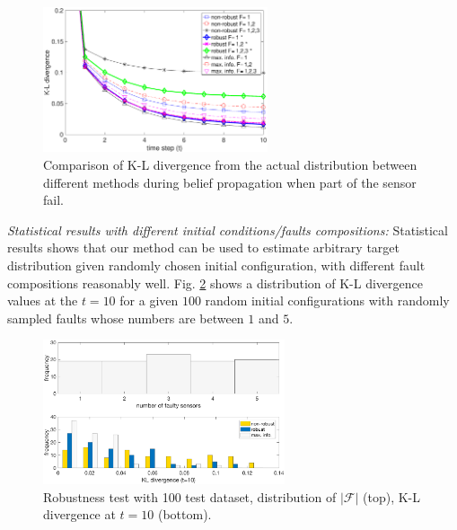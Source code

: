 \documentclass[letterpaper, 10 pt, conference]{ieeeconf}
\begin{document}
\begin{figure}
	\centering
	\includegraphics[width=2.6in]{figure/cost_comp000}
	\caption{Comparison of K-L divergence from the actual distribution between different methods during belief propagation when part of the sensor fail.}
	\label{fig:fig7}
\end{figure}


\textit{Statistical results with different initial conditions/faults compositions:}
Statistical results shows that our method can be used to estimate arbitrary target distribution given randomly chosen initial configuration, with different fault compositions reasonably well. 
Fig. \ref{fig:fig8} shows a distribution of K-L divergence values at the $t=10$ for a given $100$ random initial configurations with randomly sampled faults whose numbers are between $1$ and $5$.
\begin{figure}
	\centering
	\includegraphics[width=2.8in]{figure/stat_result}
	\caption{Robustness test with 100 test dataset, distribution of $\left|\mathcal{F}\right|$ (top), K-L divergence at $t=10$ (bottom).} 
	\label{fig:fig8}
\end{figure}

\end{document}
